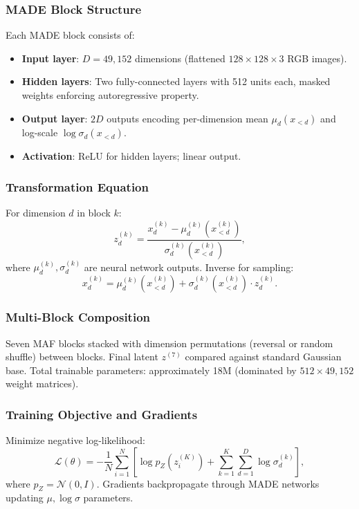 \documentclass[conference]{IEEEtran}
\begin{document}
\subsubsection{MADE Block Structure}
Each MADE block consists of:
\begin{itemize}
\item \textbf{Input layer}: $D = 49{,}152$ dimensions (flattened $128 \times 128 \times 3$ RGB images).
\item \textbf{Hidden layers}: Two fully-connected layers with 512 units each, masked weights enforcing autoregressive property.
\item \textbf{Output layer}: $2D$ outputs encoding per-dimension mean $\mu_d(x_{<d})$ and log-scale $\log \sigma_d(x_{<d})$.
\item \textbf{Activation}: ReLU for hidden layers; linear output.
\end{itemize}

\subsubsection{Transformation Equation}
For dimension $d$ in block $k$:
\begin{equation}
z^{(k)}_d = \frac{x^{(k)}_d - \mu^{(k)}_d(x^{(k)}_{<d})}{\sigma^{(k)}_d(x^{(k)}_{<d})},
\end{equation}
where $\mu^{(k)}_d, \sigma^{(k)}_d$ are neural network outputs. Inverse for sampling:
\begin{equation}
x^{(k)}_d = \mu^{(k)}_d(x^{(k)}_{<d}) + \sigma^{(k)}_d(x^{(k)}_{<d}) \cdot z^{(k)}_d.
\end{equation}

\subsubsection{Multi-Block Composition}
Seven MAF blocks stacked with dimension permutations (reversal or random shuffle) between blocks. Final latent $z^{(7)}$ compared against standard Gaussian base. Total trainable parameters: approximately 18M (dominated by $512 \times 49{,}152$ weight matrices).

\subsubsection{Training Objective and Gradients}
Minimize negative log-likelihood:
\begin{equation}
\mathcal{L}(\theta) = -\frac{1}{N} \sum_{i=1}^{N} \left[ \log p_Z(z_i^{(K)}) + \sum_{k=1}^{K} \sum_{d=1}^{D} \log \sigma^{(k)}_d \right],
\end{equation}
where $p_Z = \mathcal{N}(0, I)$. Gradients backpropagate through MADE networks updating $\mu, \log\sigma$ parameters.
\end{document}
